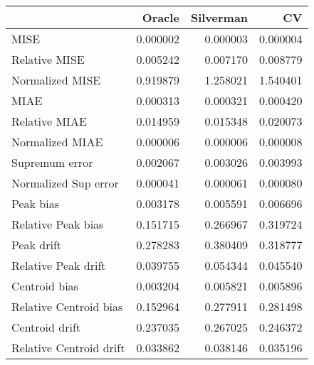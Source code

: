 \begin{tabular}{lrrr}
  \toprule
 & Oracle & Silverman & CV \\ 
  \midrule
MISE & 0.000002 & 0.000003 & 0.000004 \\ 
  Relative MISE & 0.005242 & 0.007170 & 0.008779 \\ 
  Normalized MISE & 0.919879 & 1.258021 & 1.540401 \\ 
  MIAE & 0.000313 & 0.000321 & 0.000420 \\ 
  Relative MIAE & 0.014959 & 0.015348 & 0.020073 \\ 
  Normalized MIAE & 0.000006 & 0.000006 & 0.000008 \\ 
  Supremum error & 0.002067 & 0.003026 & 0.003993 \\ 
  Normalized Sup error & 0.000041 & 0.000061 & 0.000080 \\ 
  Peak bias & 0.003178 & 0.005591 & 0.006696 \\ 
  Relative Peak bias & 0.151715 & 0.266967 & 0.319724 \\ 
  Peak drift & 0.278283 & 0.380409 & 0.318777 \\ 
  Relative Peak drift & 0.039755 & 0.054344 & 0.045540 \\ 
  Centroid bias & 0.003204 & 0.005821 & 0.005896 \\ 
  Relative Centroid bias & 0.152964 & 0.277911 & 0.281498 \\ 
  Centroid drift & 0.237035 & 0.267025 & 0.246372 \\ 
  Relative Centroid drift & 0.033862 & 0.038146 & 0.035196 \\ 
   \bottomrule
\end{tabular}

